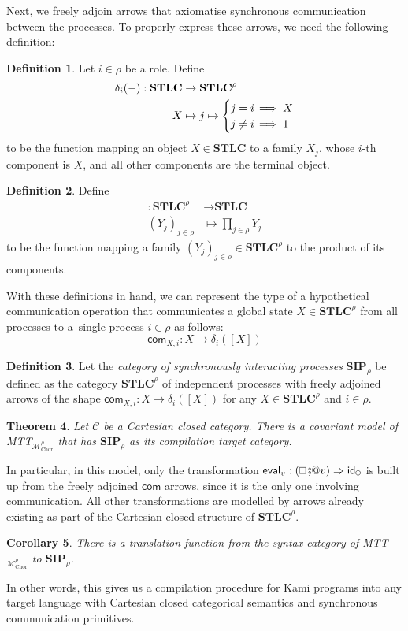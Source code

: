 \documentclass{scrartcl}
\renewcommand{\circle}{\mathop{\mathchoice%
  {\tikz{\draw (0,0) circle [radius=0.1cm];}}%
  {\tikz{\draw (0,0) circle [radius=0.1cm];}}%
  {\tikz{\draw (0,0) circle [radius=0.075cm];}}%
  {\tikz{\draw (0,0) circle [radius=0.05cm];}}}}
\renewcommand{\square}{\mathop{\mathchoice%
  {\tikz{\draw (0,0) rectangle (0.2cm,0.2cm);}}%
  {\tikz{\draw (0,0) rectangle (0.2cm,0.2cm);}}%
  {\tikz{\draw (0,0) rectangle (0.15cm,0.15cm);}}%
  {\tikz{\draw (0,0) rectangle (0.10cm,0.10cm);}}}}
\theoremstyle{definition}
\newtheorem{definition}{Definition}
\theoremstyle{plain}
\newtheorem{theorem}[definition]{Theorem}
\newtheorem{corollary}[definition]{Corollary}
\newcommand{\modetheory}[1]{\mathcal{#1}}
\newcommand{\M}{\modetheory{M}}
\newcommand{\MrhoChor}{\M^\rho_{\textrm{Chor}}}
\newcommand{\MTTMrhoChor}{MTT${}_{\MrhoChor}$}
\begin{document}
Next, we freely adjoin arrows that axiomatise synchronous communication between
the processes. To properly express these arrows, we need the following
definition:
\begin{definition}
  Let $i\in\rho$ be a role. Define
  \begin{align*}
    \delta_i({-}) : \textbf{STLC} &\to \textbf{STLC}^\rho \\
    X &\mapsto j \mapsto
    \begin{cases}
      j = i    & \mkern-5\thinmuskip \implies X\\
      j \neq i & \mkern-5\thinmuskip \implies 1
    \end{cases}
  \end{align*}
  to be the function mapping an object $X \in \textbf{STLC}$ to a family $X_j$,
  whose $i$-th component is $X$, and all other components are the terminal
  object.
\end{definition}
\begin{definition} Define
  \begin{align*}
    [{-}] : \textbf{STLC}^\rho &\to \textbf{STLC} \\
    (Y_j)_{j\in\rho} &\mapsto \prod_{j \in \rho} Y_j
  \end{align*}
  to be the function mapping a family $(Y_j)_{j\in\rho} \in \textbf{STLC}^\rho$
  to the product of its components.
\end{definition}
With these definitions in hand, we can represent the type of a hypothetical
communication operation that communicates a global state $X \in
\textbf{STLC}^\rho$ from all processes to a~single process $i \in \rho$ as
follows:
\[
  \textsf{com}_{X,i} : X \to \delta_i([X])
\]
\begin{definition}
  Let the \emph{category of synchronously interacting processes}
  $\textbf{SIP}_{\rho}$ be
  defined as the category $\textbf{STLC}^\rho$ of independent processes with
  freely adjoined arrows of the shape $\textsf{com}_{X,i} : X \to
  \delta_i([X])$ for any $X \in \textbf{STLC}^\rho$ and $i \in \rho$.
\end{definition}
\begin{theorem}
  Let {\upshape$\mathcal{C}$} be a Cartesian closed category. There is a
  covariant model of {\upshape \MTTMrhoChor} that has
  {\upshape$\textbf{SIP}_{\rho}$} as its compilation target category.
\end{theorem}
In particular, in this model, only the transformation $\textsf{eval}_v :
(\square \fatsemi @v) \Rightarrow \textsf{id}_{\circle}$ is built up from the
freely adjoined $\textsf{com}$ arrows, since it is the only one involving
communication. All other transformations are modelled by arrows already
existing as part of the Cartesian closed structure of $\textbf{STLC}^\rho$.
\begin{corollary}
  There is a translation function from the syntax category of {\upshape
  \MTTMrhoChor} to {\upshape$\textbf{SIP}_{\rho}$}.
\end{corollary}
In other words, this gives us a compilation procedure for Kami programs into
any target language with Cartesian closed categorical semantics and synchronous
communication primitives.
\end{document}

